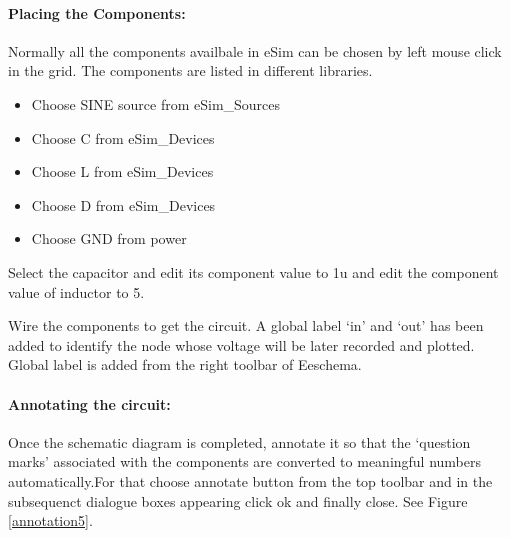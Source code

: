 \paragraph{Placing the Components:} Normally all the components availbale in eSim can be chosen by left mouse click in the grid. The components are listed in different libraries. %


\begin{itemize}
\item
Choose SINE source from eSim\_Sources
\item
Choose C from eSim\_Devices
\item
Choose L from eSim\_Devices
\item
Choose D from eSim\_Devices
\item
Choose GND from power
\end{itemize}

Select the capacitor and edit its component value to 1u and edit the component value of inductor to 5.%


Wire the components to get the circuit. A global label `in'  and `out' has been added to identify the node whose voltage will be later recorded and plotted. Global label is added from the right toolbar of Eeschema.

\paragraph{Annotating the circuit:} Once the schematic diagram is completed, annotate it so that the `question marks' associated with the components are converted to meaningful numbers automatically.For that choose annotate button from the top toolbar and in the subsequenct dialogue boxes appearing click ok and finally close. See Figure \ref{annotation5}.




